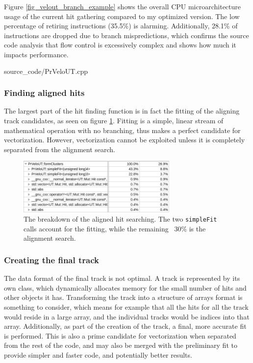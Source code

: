 \documentclass[12pt]{article}
\newcommand{\code}[1]{\texttt{#1}}
\begin{document}
Figure \ref{fig_velout_branch_example} shows the overall CPU microarchitecture usage of the current hit gathering compared to my optimized version. The low percentage of retiring instructions (35.5\%) is alarming. Additionally, 28.1\% of instructions are dropped due to branch mispredictions, which confirms the source code analysis that flow control is excessively complex and shows how much it impacts performance.
\newpage

	{source_code/PrVeloUT.cpp}
\newpage

\subsubsection{Finding aligned hits}

The largest part of the hit finding function is in fact the fitting of the aligning track candidates, as seen on figure \ref{fig_velout_hotspots_orig_formclusters}. Fitting is a simple, linear stream of mathematical operation with no branching, thus makes a perfect candidate for vectorization. However, vectorization cannot be exploited unless it is completely separated from the alignment search.

\begin{figure}[H]
	\begin{center}
		\includegraphics[width=0.7\textwidth]{velout_hotspots_orig_formclusters}
	\end{center}
	\caption[CPU hotspots of the VELO-UT aligned hit search]{The breakdown of the aligned hit searching. The two \code{simpleFit} calls account for the fitting, while the remaining ~30\% is the alignment search.}
	\label{fig_velout_hotspots_orig_formclusters}
\end{figure}


\subsubsection{Creating the final track}

The data format of the final track is not optimal. A track is represented by its own class, which dynamically allocates memory for the small number of hits and other objects it has. Transforming the track into a structure of arrays format is something to consider, which means for example that all the hits for all the track would reside in a large array, and the individual tracks would be indices into that array.
Additionally, as part of the creation of the track, a final, more accurate fit is performed. This is also a prime candidate for vectorization when separated from the rest of the code, and may also be merged with the preliminary fit to provide simpler and faster code, and potentially better results.
\end{document}
